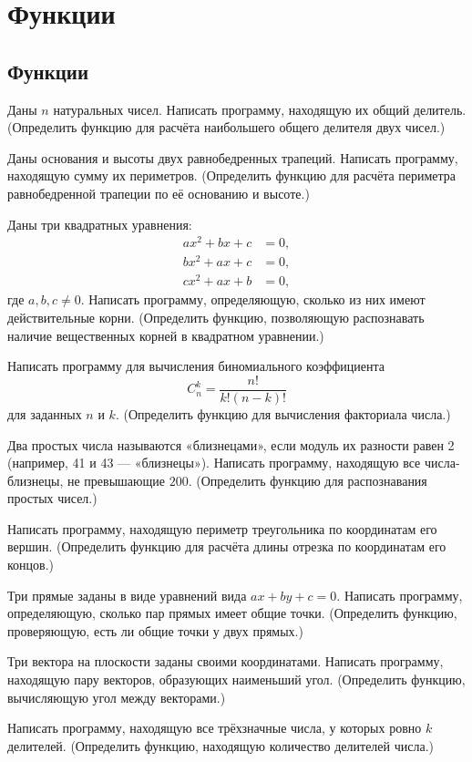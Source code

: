 \section{Функции}

\subsection{Функции}

\task Даны $n$ натуральных чисел. Написать программу, находящую их
общий делитель. (Определить функцию для расчёта наибольшего общего
делителя двух чисел.)

\task Даны основания и высоты двух равнобедренных трапеций. Написать
программу, находящую сумму их периметров. (Определить функцию для
расчёта периметра равнобедренной трапеции по её основанию и высоте.)

\task Даны три квадратных уравнения:
\begin{align*}
a x^2 + b x + c &= 0,\\
b x^2 + a x + c &= 0,\\
c x^2 + a x + b &= 0,
\end{align*}
где $a,b,c\neq 0.$
Написать программу, определяющую, сколько из них имеют действительные
корни. (Определить функцию, позволяющую распознавать наличие
вещественных корней в квадратном уравнении.)

\task Написать программу для вычисления биномиального коэффициента
\[
C_n^k = \frac{n!}{k!(n-k)!}
\]
для заданных $n$ и $k$. (Определить функцию для вычисления факториала
числа.)

\task Два простых числа называются «близнецами», если модуль их
разности равен 2 (например, 41 и 43 — «близнецы»). Написать программу,
находящую все числа-близнецы, не превышающие $200$. (Определить
функцию для распознавания простых чисел.)

\task Написать программу, находящую периметр треугольника по
координатам его вершин. (Определить функцию для расчёта длины отрезка
по координатам его концов.)

\task Три прямые заданы в виде уравнений вида $ax+by+c=0$. Написать
программу, определяющую, сколько пар прямых имеет общие
точки. (Определить функцию, проверяющую, есть ли общие точки у двух
прямых.)

\task Три вектора на плоскости заданы своими координатами. Написать
программу, находящую пару векторов, образующих наименьший
угол. (Определить функцию, вычисляющую угол между векторами.)

\task Написать программу, находящую все трёхзначные числа, у которых
ровно $k$ делителей. (Определить функцию, находящую количество
делителей числа.)

